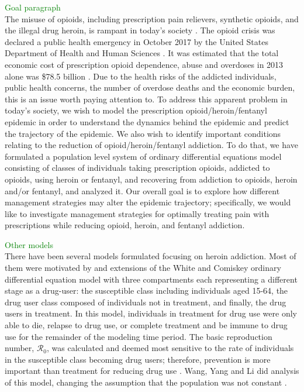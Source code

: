 \documentclass[12pt]{article}
\begin{document}
\textcolor{green}{Goal paragraph} \\ 
The misuse of opioids, including prescription pain relievers, synthetic opioids, and the illegal drug heroin, is rampant in today's society \cite{NIH2}. The opioid crisis was declared a public health emergency in October 2017 by the United States Department of Health and Human Sciences \cite{HHS1}. It was estimated that the total economic cost of prescription opioid dependence, abuse and overdoses in 2013 alone was \$78.5 billion \cite{Florence}. Due to the health risks of the addicted individuals, public health concerns, the number of overdose deaths and the economic burden, this is an issue worth paying attention to.
To address this apparent problem in today's society, we wish to model the prescription opioid/heroin/fentanyl epidemic in order to understand the dynamics behind the epidemic and predict the trajectory of the epidemic. We also wish to identify important conditions relating to the reduction of opioid/heroin/fentanyl addiction. To do that, we have formulated a population level system of ordinary differential equations model consisting of classes of individuals taking prescription opioids, addicted to opioids, using heroin or fentanyl, and recovering from addiction to opioids, heroin and/or fentanyl, and analyzed it. Our overall goal is to explore how different management strategies may alter the epidemic trajectory; specifically, we would like to investigate management strategies for optimally treating pain with prescriptions while reducing opioid, heroin, and fentanyl addiction.

\textcolor{green}{Other models} \\
There have been several models formulated focusing on heroin addiction. Most of them were motivated by and extensions of the White and Comiskey ordinary differential equation model with three compartments each representing a different stage as a drug-user: the susceptible class including individuals aged 15-64, the drug user class composed of individuals not in treatment, and finally, the drug users in treatment. In this model, individuals in treatment for drug use were only able to die, relapse to drug use, or complete treatment and be immune to drug use for the remainder of the modeling time period. The basic reproduction number, $\mathscr{R}_0$, was calculated and deemed most sensitive to the rate of individuals in the susceptible class becoming drug users; therefore, prevention is more important than treatment for reducing drug use \cite{White}. Wang, Yang and Li did analysis of this model, changing the assumption that the population was not constant \cite{Wang}. 
\end{document}
